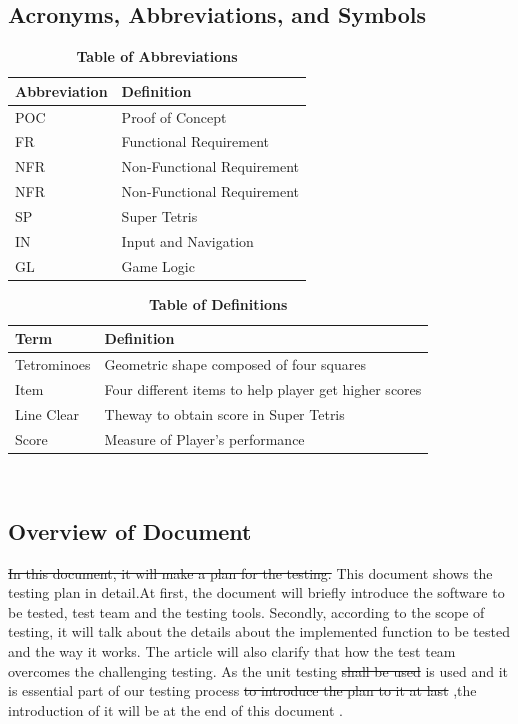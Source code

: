 \documentclass[12pt, titlepage]{article}
\begin{document}
\subsection{Acronyms, Abbreviations, and Symbols}
	
\begin{table}[hbp]
\caption{\textbf{Table of Abbreviations}} \label{Table}

\begin{tabularx}{\textwidth}{p{3cm}X}
\toprule
\textbf{Abbreviation} & \textbf{Definition} \\
\midrule
POC & Proof of Concept\\
FR & Functional Requirement\\
NFR & Non-Functional Requirement\\
NFR & Non-Functional Requirement\\
SP & Super Tetris\\
IN & Input and Navigation\\
GL & Game Logic\\
\bottomrule
\end{tabularx}

\end{table}

\begin{table}[!htbp]
\caption{\textbf{Table of Definitions}} \label{Table}

\begin{tabularx}{\textwidth}{p{3cm}X}
\toprule
\textbf{Term} & \textbf{Definition}\\
\midrule
Tetrominoes & Geometric shape composed of four squares\\
Item &  Four different items to help player get higher scores\\
Line Clear & Theway to obtain score in Super Tetris\\
Score & Measure of Player's performance\\
\bottomrule
\end{tabularx}
\end{table}	

~\newline
\subsection{Overview of Document}
\tab  \st{In this document, it will make a plan for the testing.} {\color{red} This document shows the testing plan in detail.}At first, the document will briefly introduce the software to be tested, test team and the testing tools. Secondly, according to the scope of testing, it will talk about the details about the implemented function to be tested and the way it works. The article will also clarify that how the test team overcomes the challenging testing. As the unit testing \st{shall be used} {\color{red} is used  and } it is essential  {\color{red} part of our testing process } \st{to introduce the plan to it at last}{\color{red} ,the introduction  of it will be at the end of this document}  .
\end{document}
